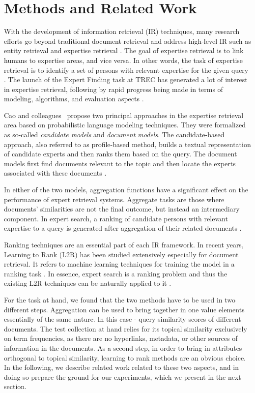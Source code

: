 \section{Methods and Related Work}
\label{sec:methods}
With the development of information retrieval (IR) techniques, many research efforts go beyond traditional document retrieval and address high-level IR such as entity retrieval and expertise retrieval \cite{er-sparse}. The goal of expertise retrieval is to link humans to expertise areas, and vice versa. In other words, the task of expertise retrieval is to identify a set of persons with relevant expertise for the given query \cite{er,er-community-aware}.
The launch of the Expert Finding task at TREC has generated a lot of interest in expertise retrieval, following by rapid progress being made in terms of modeling, algorithms, and evaluation aspects \cite{trec2005,er-community-aware}.

Cao and colleagues~\cite{trec2005} propose two principal approaches  in the expertise retrieval area based on probabilistic language modeling techniques. They were formalized as so-called \textit{candidate models} and \textit{document models}. The candidate-based approach, also referred to as profile-based method, builds a textual representation of candidate experts and then ranks them based on the query. The document models first find documents relevant to the topic and then locate the experts associated with these documents \cite{er}.

In either of the two models, aggregation functions have a significant effect on the performance of expert retrieval systems. Aggregate tasks are those where documents' similarities are not
the final outcome, but instead an intermediary component. In expert search, a ranking of candidate persons with relevant expertise to a query is generated after aggregation of their related documents \cite{agg-learning}.

Ranking techniques are an essential part of each IR framework. In recent years, Learning to Rank (L2R) has been studied extensively especially for document retrieval. It refers to machine learning techniques for training the model in a ranking task \cite{er}. In essence, expert search is a ranking problem and thus the existing L2R techniques can be naturally applied to it \cite{l2r-intro}.

For the task at hand, we found that the two methods have to be used in two different steps. Aggregation can be used to bring together in one value elements essentially of the same nature. In this case - query similarity scores of different documents. The test collection at hand relies for its topical similarity exclusively on term frequencies, as there are no hyperlinks, metadata, or other sources of information in the documents. As a second step, in order to bring in attributes orthogonal to topical similarity, learning to rank methods are an obvious choice. In the following, we describe related work related to these two aspects, and in doing so prepare the ground for our experiments, which we present in the next section.


